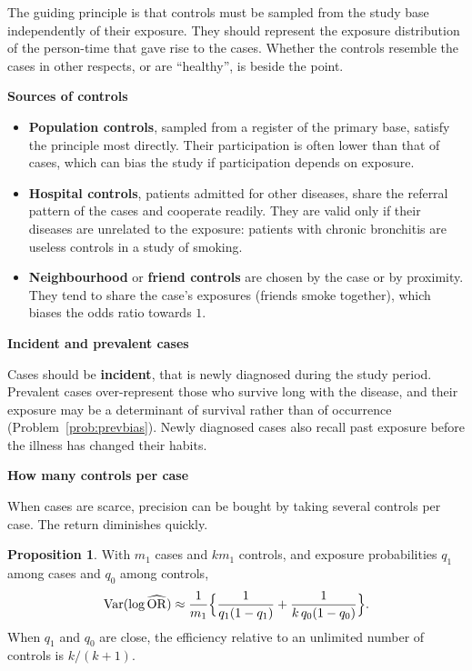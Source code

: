 \documentclass[11pt,a4paper]{article}
\numberwithin{equation}{section}
\DeclareMathOperator{\Var}{Var}
\DeclareMathOperator{\OR}{OR}
\theoremstyle{definition}
\newtheorem{prop}[thm]{Proposition}
\newcommand{\subhead}[1]{%
  \par\medskip\noindent\textbf{#1}\par\nobreak\smallskip}
\begin{document}
The guiding principle is that controls must be sampled from the study base independently of their exposure. They
should represent the exposure distribution of the person-time that gave rise to the cases. Whether the controls resemble the cases in other respects,
or are ``healthy'', is beside the point.

\subhead{Sources of controls}

\begin{itemize}
\item \textbf{Population controls}, sampled from a register of the primary base, satisfy the principle most directly. Their
participation is often lower than that of cases, which can bias the study if participation depends on exposure.
\item \textbf{Hospital controls}, patients admitted for other diseases, share the referral pattern of the cases and cooperate readily.
They are valid only if their diseases are unrelated to the exposure: patients with chronic bronchitis are useless controls in a study
of smoking.
\item \textbf{Neighbourhood} or \textbf{friend controls} are chosen by the case or by proximity. They tend to share the case's exposures (friends
smoke together), which biases the odds ratio towards $1$.
\end{itemize}

\subhead{Incident and prevalent cases}

Cases should be \textbf{incident}, that is newly diagnosed during the study period. Prevalent cases over-represent those who survive long with
the disease, and their exposure may be a determinant of survival rather than of occurrence (Problem~\ref{prob:prevbias}). Newly
diagnosed cases also recall past exposure before the illness has changed their habits.

\subhead{How many controls per case}

When cases are scarce, precision can be bought by taking several controls per case. The return diminishes quickly.

\begin{prop}
\label{prop:kcontrols}
With $m_1$ cases and $k m_1$ controls, and exposure probabilities $q_1$ among cases and $q_0$ among controls,
\[
\Var(\log\widehat{\OR}) \approx \frac{1}{m_1}\Bigl\{\frac{1}{q_1(1 - q_1)} + \frac{1}{k\,q_0(1 - q_0)}\Bigr\} .
\]
When $q_1$ and $q_0$ are close, the efficiency relative to an unlimited number of controls is $k/(k + 1)$.
\end{prop}
\end{document}
